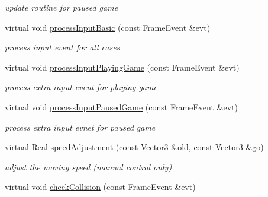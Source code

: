 \begin{DoxyCompactItemize}
\begin{DoxyCompactList}\small\item\em update routine for paused game \end{DoxyCompactList}\item 
virtual void \hyperlink{class_basic_tutorial__00_a6ca5eb34b732ed3621f0b15cfa726ba8}{process\+Input\+Basic} (const Frame\+Event \&evt)\hypertarget{class_basic_tutorial__00_a6ca5eb34b732ed3621f0b15cfa726ba8}{}\label{class_basic_tutorial__00_a6ca5eb34b732ed3621f0b15cfa726ba8}

\begin{DoxyCompactList}\small\item\em process input event for all cases \end{DoxyCompactList}\item 
virtual void \hyperlink{class_basic_tutorial__00_a369c001eb86a792d15b3d1aefdd7b030}{process\+Input\+Playing\+Game} (const Frame\+Event \&evt)\hypertarget{class_basic_tutorial__00_a369c001eb86a792d15b3d1aefdd7b030}{}\label{class_basic_tutorial__00_a369c001eb86a792d15b3d1aefdd7b030}

\begin{DoxyCompactList}\small\item\em process extra input event for playing game \end{DoxyCompactList}\item 
virtual void \hyperlink{class_basic_tutorial__00_a56a6c761ca0a639a11f1634e5f37a300}{process\+Input\+Paused\+Game} (const Frame\+Event \&evt)\hypertarget{class_basic_tutorial__00_a56a6c761ca0a639a11f1634e5f37a300}{}\label{class_basic_tutorial__00_a56a6c761ca0a639a11f1634e5f37a300}

\begin{DoxyCompactList}\small\item\em process extra input evnet for paused game \end{DoxyCompactList}\item 
virtual Real \hyperlink{class_basic_tutorial__00_abf7135bae86a71ec26344f1226bc70c0}{speed\+Adjustment} (const Vector3 \&old, const Vector3 \&go)\hypertarget{class_basic_tutorial__00_abf7135bae86a71ec26344f1226bc70c0}{}\label{class_basic_tutorial__00_abf7135bae86a71ec26344f1226bc70c0}

\begin{DoxyCompactList}\small\item\em adjust the moving speed (manual control only) \end{DoxyCompactList}\item 
virtual void \hyperlink{class_basic_tutorial__00_a013e1d3a955971b0b9cbdd0d34f6efd7}{check\+Collision} (const Frame\+Event \&evt)\hypertarget{class_basic_tutorial__00_a013e1d3a955971b0b9cbdd0d34f6efd7}{}\label{class_basic_tutorial__00_a013e1d3a955971b0b9cbdd0d34f6efd7}


\end{DoxyCompactItemize}
